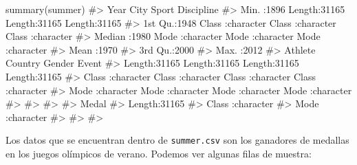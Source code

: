 \documentclass[
  letterpaper,
  DIV=11,
  numbers=noendperiod,
  oneside]{scrreprt}
\newenvironment{Shaded}{\begin{snugshade}}{\end{snugshade}}
\newcommand{\CommentTok}[1]{\textcolor[rgb]{0.37,0.37,0.37}{#1}}
\newcommand{\FunctionTok}[1]{\textcolor[rgb]{0.28,0.35,0.67}{#1}}
\newcommand{\NormalTok}[1]{\textcolor[rgb]{0.00,0.23,0.31}{#1}}
\begin{document}
\begin{Shaded}
\begin{Highlighting}[]
\FunctionTok{summary}\NormalTok{(summer)}
\CommentTok{\#\textgreater{}       Year          City              Sport            Discipline       }
\CommentTok{\#\textgreater{}  Min.   :1896   Length:31165       Length:31165       Length:31165      }
\CommentTok{\#\textgreater{}  1st Qu.:1948   Class :character   Class :character   Class :character  }
\CommentTok{\#\textgreater{}  Median :1980   Mode  :character   Mode  :character   Mode  :character  }
\CommentTok{\#\textgreater{}  Mean   :1970                                                           }
\CommentTok{\#\textgreater{}  3rd Qu.:2000                                                           }
\CommentTok{\#\textgreater{}  Max.   :2012                                                           }
\CommentTok{\#\textgreater{}    Athlete            Country             Gender             Event          }
\CommentTok{\#\textgreater{}  Length:31165       Length:31165       Length:31165       Length:31165      }
\CommentTok{\#\textgreater{}  Class :character   Class :character   Class :character   Class :character  }
\CommentTok{\#\textgreater{}  Mode  :character   Mode  :character   Mode  :character   Mode  :character  }
\CommentTok{\#\textgreater{}                                                                             }
\CommentTok{\#\textgreater{}                                                                             }
\CommentTok{\#\textgreater{}                                                                             }
\CommentTok{\#\textgreater{}     Medal          }
\CommentTok{\#\textgreater{}  Length:31165      }
\CommentTok{\#\textgreater{}  Class :character  }
\CommentTok{\#\textgreater{}  Mode  :character  }
\CommentTok{\#\textgreater{}                    }
\CommentTok{\#\textgreater{}                    }
\CommentTok{\#\textgreater{} }
\end{Highlighting}
\end{Shaded}

Los datos que se encuentran dentro de \texttt{summer.csv} son los
ganadores de medallas en los juegos olímpicos de verano. Podemos ver
algunas filas de muestra:
\end{document}
